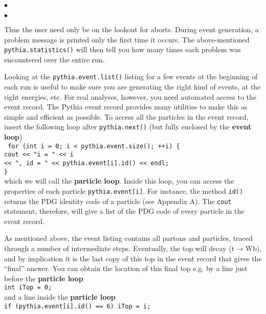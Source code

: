 \documentclass[12pt,a4paper]{article}
\renewcommand{\b}{{\mathrm b}}
\renewcommand{\t}{{\mathrm t}}
\newcommand{\W}{{\mathrm W}}
\newenvironment{Itemize}{\begin{list}{$\bullet$}%
{\setlength{\topsep}{0.4mm}\setlength{\partopsep}{0.4mm}%
\setlength{\itemsep}{0.4mm}\setlength{\parsep}{0.4mm}}}%
{\end{list}}
\begin{document}
\begin{Itemize}
\begin{Itemize}
\end{Itemize}
Thus the user need only be on the lookout for aborts. During event
generation, a problem message is printed only the first time it occurs. The
above-mentioned \texttt{pythia.statistics()} will then tell you how many
times each problem was encountered over the entire run.
\item Looking at the \texttt{pythia.event.list()} listing for a few events
at the beginning of each run is useful to make sure you are generating the
right kind of events, at the right energies, etc. For real analyses,
however, you need automated access to the event record. The Pythia event
record provides many utilities to make this as simple and efficient as
possible. To access all the particles in the event record, insert the
following loop after \texttt{pythia.next()} (but fully enclosed by the
\textbf{event loop}) \\
\texttt{
\hspace*{10mm} for (int i = 0; i < pythia.event.size(); ++i) \{ \\
\hspace*{15mm}   cout << "i = " << i \\
\hspace*{26mm}        << ", id = " << pythia.event[i].id() << endl; \\
\hspace*{10mm} \} \\
}
which we will call the \textbf{particle loop}. Inside this loop, you
can access the properties of each particle \texttt{pythia.event[i]}. For
instance, the method \texttt{id()} returns the PDG identity code of a
particle (see Appendix A). The \texttt{cout} statement, therefore, will
give a list of the PDG code of every particle in the event record.
\item As mentioned above, the event listing contains all partons and
particles, traced through a number of intermediate steps. Eventually, the
top will decay ($\t \to \W \b$), and by implication it is the last copy of
this top in the event record that gives the ``final'' answer. You can obtain
the location of this final top e.g. by a line just before the
\textbf{particle loop} \\
\hspace*{10mm}\texttt{int iTop = 0;} \\
and a line inside the \textbf{particle loop} \\
\hspace*{10mm}\texttt{if (pythia.event[i].id() == 6) iTop = i;} \\ 

\end{Itemize}
\end{document}
